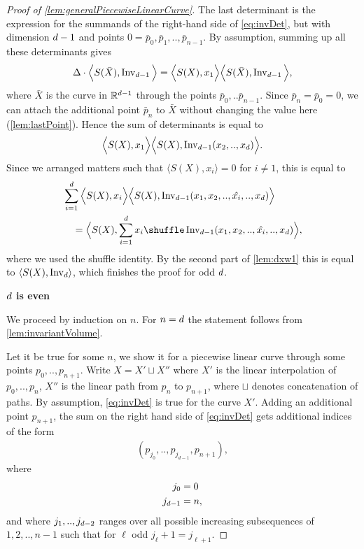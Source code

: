 \begin{proof}[Proof of \autoref{lem:generalPiecewiseLinearCurve}]
  The last determinant is the expression for the summands of the right-hand side of \eqref{eq:invDet},
  but with dimension $d -1$ and points $0 = \bar p_0, \bar p_1, .., \bar p_{n-1}$.
  By assumption, summing up all these determinants gives
  \begin{align*}
    \Delta \cdot \Big\langle S(\bar X), \operatorname{Inv}_{d-1} \Big\rangle
    =
    \Big\langle S(X), x_1 \Big\rangle \Big\langle S(\bar X), \operatorname{Inv}_{d-1} \Big\rangle,
  \end{align*}
  where $\bar X$ is the curve in $\mathbb{R}^{d-1}$ through the points $\bar p_0, .. \bar p_{n-1}$.
  Since $\bar p_n = \bar p_0 = 0$,
  we can attach the additional point $\bar p_n$ to $\bar X$ without changing the value here (\autoref{lem:lastPoint}).
  Hence the sum of determinants is equal to
  \begin{align*}
    \Big\langle S(X), x_1 \Big\rangle \Big\langle S(X), \operatorname{Inv}_{d-1}(x_2,..,x_d) \Big\rangle.
  \end{align*}
  Since we arranged matters such that $\Big\langle S(X), x_i \Big\rangle = 0$ for $i\not=1$,
  this is equal to
  \begin{align*}
    &\sum_{i=1}^\ds \Big\langle S(X), x_i \Big\rangle \Big\langle S(X), \firstInvariant{\ds-1}(x_1, x_2,..,\hat{x_i},..,x_\ds) \Big\rangle \\
    &\quad= \Big\langle S(X), \sum_{i=1}^\ds x_i \shuffle \firstInvariant{\ds-1}(x_1, x_2,..,\hat{x_i},..,x_\ds) \Big\rangle,
  \end{align*}
  where we used the shuffle identity.
  By the second part of \autoref{lem:dxw1} this is equal to $\langle S(X), \operatorname{Inv}_{d} \rangle$, which finishes the proof for odd $d$.

  \textbf{$d$ is even }


  We proceed by induction on $n$.
  For $n=d$ the statement follows from \autoref{lem:invariantVolume}.

  Let it be true for some $n$, we show it for a piecewise linear curve through some points $p_0, .., p_{n+1}$.
  Write $X = X' \sqcup X''$ where $X'$ is the linear interpolation
  of $p_0, .., p_n$, $X''$ is the linear path from $p_n$ to $p_{n+1}$,
  where $\sqcup$ denotes concatenation of paths.
  By assumption, \eqref{eq:invDet} is true for the curve $X'$.
  Adding an additional point $p_{n+1}$,
  the sum on the right hand side of \eqref{eq:invDet}
  gets additional indices of the form
  \begin{align*}
    (p_{j_0}, .., p_{j_{d-1}}, p_{n+1}),
  \end{align*}
  where
  \begin{align*}
    j_0 &= 0 \\
    j_{d-1} &= n,
  \end{align*}
  and where $j_1,..,j_{d-2}$ ranges over all possible increasing
  subsequences of $1,2,..,n-1$ such that
  for $\ell$ odd $j_\ell + 1 = j_{\ell+1}$.
  


\end{proof}
